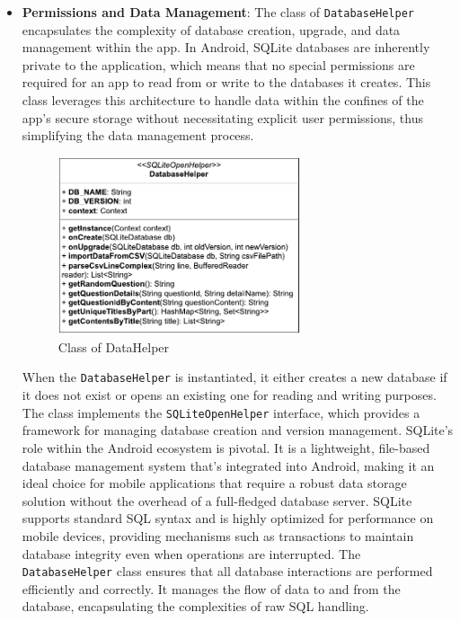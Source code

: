 \documentclass[conference,10pt,letterpaper]{IEEEtran}
\begin{document}
	\begin{itemize}
		\item \textbf{Permissions and Data Management}:
		The class of \texttt{DatabaseHelper} encapsulates the complexity of database creation, upgrade, and data management within the app. In Android, SQLite databases are inherently private to the application, which means that no special permissions are required for an app to read from or write to the databases it creates. This class leverages this architecture to handle data within the confines of the app's secure storage without necessitating explicit user permissions, thus simplifying the data management process.
		
		\begin{figure}[htbp]
			\centerline{\includegraphics[width=2.8in]{src/datahelper.pdf}}
			\caption{Class of DataHelper}
			\label{fig:datahelper class}
		\end{figure}
		
		When the \texttt{DatabaseHelper} is instantiated, it either creates a new database if it does not exist or opens an existing one for reading and writing purposes. The class implements the \texttt{SQLiteOpenHelper} interface, which provides a framework for managing database creation and version management.  SQLite's role within the Android ecosystem is pivotal. It is a lightweight, file-based database management system that's integrated into Android, making it an ideal choice for mobile applications that require a robust data storage solution without the overhead of a full-fledged database server. SQLite supports standard SQL syntax and is highly optimized for performance on mobile devices, providing mechanisms such as transactions to maintain database integrity even when operations are interrupted. The \texttt{DatabaseHelper} class ensures that all database interactions are performed efficiently and correctly. It manages the flow of data to and from the database, encapsulating the complexities of raw SQL handling. 
		

\end{itemize}
\end{document}
